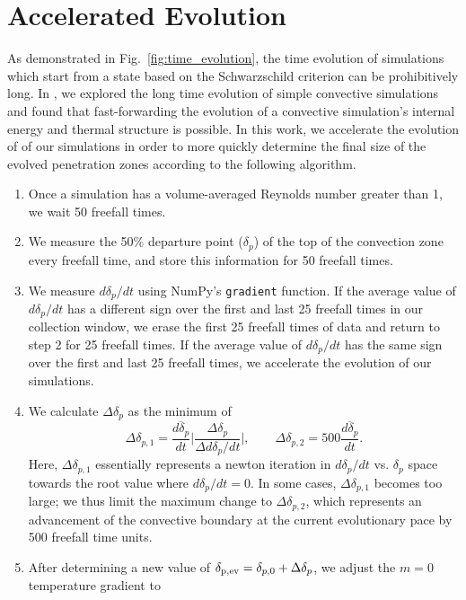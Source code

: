 \documentclass{aastex631}
\begin{document}
\section{Accelerated Evolution}
\label{app:accelerated_evolution}
As demonstrated in Fig.~\ref{fig:time_evolution}, the time evolution of simulations which start from a state based on the Schwarzschild criterion can be prohibitively long.
In \citet{anders_etal_2018}, we explored the long time evolution of simple convective simulations and found that fast-forwarding the evolution of a convective simulation's internal energy and thermal structure is possible.
In this work, we accelerate the evolution of of our simulations in order to more quickly determine the final size of the evolved penetration zones according to the following algorithm.
\begin{enumerate}
\item Once a simulation has a volume-averaged Reynolds number greater than 1, we wait 50 freefall times.
\item We measure the 50\% departure point ($\delta_p$) of the top of the convection zone every freefall time, and store this information for 50 freefall times.
\item We measure $d\delta_p/dt$ using NumPy's \texttt{gradient} function. 
If the average value of $d\delta_p/dt$ has a different sign over the first and last 25 freefall times in our collection window, we erase the first 25 freefall times of data and return to step 2 for 25 freefall times.
If the average value of $d\delta_p/dt$ has the same sign over the first and last 25 freefall times, we accelerate the evolution of our simulations.
\item We calculate $\Delta\delta_p$ as the minimum of 
\begin{equation}
\Delta\delta_{p,1} = \overline{\frac{d\delta_p}{dt}}\bigg|\frac{\Delta \delta_p}{\Delta d \delta_p / dt} \bigg|,\qquad
\Delta\delta_{p,2} = 500\overline{\frac{d\delta_p}{dt}}.
\end{equation}
Here, $\Delta\delta_{p,1}$ essentially represents a newton iteration in $d\delta_p / dt$ vs. $\delta_p$ space towards the root value where $d\delta_p / dt = 0$.
In some cases, $\Delta\delta_{p,1}$ becomes too large; we thus limit the maximum change to $\Delta\delta_{p,2}$, which represents an advancement of the convective boundary at the current evolutionary pace by 500 freefall time units.
\item After determining a new value of $\delta_{\rm{p,ev}} = \delta_{p,0} + \Delta\delta_p$, we adjust the $m = 0$ temperature gradient to

\end{enumerate}
\end{document}
